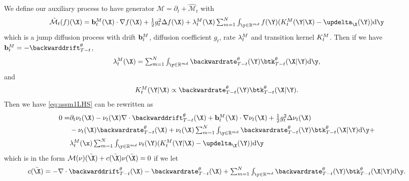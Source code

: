 We define our auxiliary process to have generator $\mathcal{M} = \partial_t + \hat{\mathcal{M}}_t$ with
\begin{equation}
  \textstyle 
    \hat{\mathcal{M}}_t(f)(\X) = \mdrift_t (\X) \cdot \nabla f(\X) + \frac{1}{2} g_{t}^2 \Delta f (\X) + \mrate_t(\X) \inty f(\Y) ( \mtk_t(\Y | \X) - \updelta_{\X}(\Y) ) \rmd \y
\end{equation}
which is a jump diffusion process with drift $\mathbf{b}^M_t$, diffusion coefficient $g_{t}$, rate $\lambda^M_t$ and transition kernel $K^{M}_t$. Then if we have $\mdrift_t = - \backwarddrift_{T-t}^\theta$,
\begin{equation}
  \label{eq:def_mrate}
  \textstyle 
    \mrate_t(\X) = \inty \backwardrate_{T-t}^\theta(\Y) \btk_{T-t}^\theta(\X | \Y) \rmd \y , 
\end{equation}
and
\begin{equation}
  \label{eq:def_mtkt}
  \textstyle 
    \mtk_t (\Y | \X) \propto \backwardrate_{T-t}^\theta(\Y) \btk_{T-t}^\theta(\X | \Y) . 
\end{equation}
Then we have \eqref{eq:assm1LHS} can be rewritten as 
\begin{align}
    0 = &\textstyle \partial_t \nu_t(\X) - \nu_t(\X) \nabla \cdot \backwarddrift_{T-t}^\theta(\X) + \mdrift_t(\X) \cdot \nabla \nu_t(\X) + \frac{1}{2} g_{t}^2 \Delta \nu_t(\X)\\
    &\textstyle - \nu_t(\X) \backwardrate_{T-t}^\theta(\X) + \nu_t(\X) \inty \backwardrate_{T-t}^\theta(\Y) \btk_{T-t}^\theta(\X | \Y) \rmd \y + \\
    &\textstyle  \mrate_t(\x) \inty \nu_t(\Y) ( \mtk_t(\Y | \X) - \updelta_{\X}(\Y) )\rmd \y
\end{align}
which is in the form $\mathcal{M}(\nu)(\bar{\X}) + c(\bar{\X}) \nu(\bar{\X}) = 0$ if we let
\begin{equation}
  \textstyle 
    c(\bar{\X}) = -\nabla \cdot \backwarddrift_{T-t}^\theta(\X) - \backwardrate_{T-t}^\theta(\X) + \inty \backwardrate_{T-t}^\theta(\Y) \btk_{T-t}^\theta(\X | \Y) \rmd \y . 
\end{equation}

